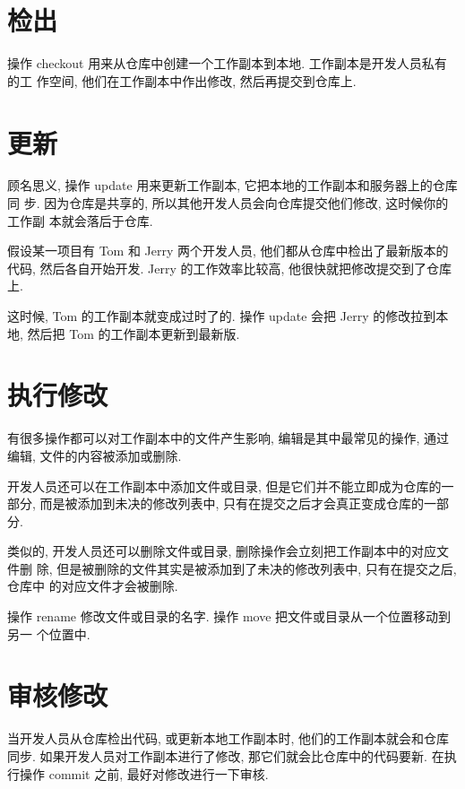 \documentclass[nofonts, oneside]{ctexbook}
\begin{document}
\section{检出}
\label{sec:checkout}

操作 checkout 用来从仓库中创建一个工作副本到本地. 工作副本是开发人员私有的工
作空间, 他们在工作副本中作出修改, 然后再提交到仓库上.

\section{更新}
\label{sec:update}

顾名思义, 操作 update 用来更新工作副本, 它把本地的工作副本和服务器上的仓库同
步. 因为仓库是共享的, 所以其他开发人员会向仓库提交他们修改, 这时候你的工作副
本就会落后于仓库.

假设某一项目有 Tom 和 Jerry 两个开发人员, 他们都从仓库中检出了最新版本的代码,
然后各自开始开发. Jerry 的工作效率比较高, 他很快就把修改提交到了仓库上.

这时候, Tom 的工作副本就变成过时了的. 操作 update 会把 Jerry 的修改拉到本地,
然后把 Tom 的工作副本更新到最新版.

\section{执行修改}
\label{sec:perform_changes}

有很多操作都可以对工作副本中的文件产生影响, 编辑是其中最常见的操作, 通过编辑,
文件的内容被添加或删除.

开发人员还可以在工作副本中添加文件或目录, 但是它们并不能立即成为仓库的一部分,
而是被添加到未决的修改列表中, 只有在提交之后才会真正变成仓库的一部分.

类似的, 开发人员还可以删除文件或目录, 删除操作会立刻把工作副本中的对应文件删
除, 但是被删除的文件其实是被添加到了未决的修改列表中, 只有在提交之后, 仓库中
的对应文件才会被删除.

操作 rename 修改文件或目录的名字. 操作 move 把文件或目录从一个位置移动到另一
个位置中.

\section{审核修改}
\label{sec:review_changes}

当开发人员从仓库检出代码, 或更新本地工作副本时, 他们的工作副本就会和仓库同步.
如果开发人员对工作副本进行了修改, 那它们就会比仓库中的代码要新. 在执行操作
commit 之前, 最好对修改进行一下审核.
\end{document}
